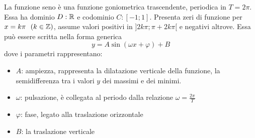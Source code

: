 \documentclass{article}     %
\begin{document}
        \begin{wrapfigure}{r}{0.5\textwidth}
            \centering
            \begin{center}
            \end{center}
        \end{wrapfigure}
        La funzione seno è una funzione goniometrica trascendente, periodica in $T=2\pi$. Essa ha dominio $D:\mathbb{R}$ e codominio $C:[-1;1]$. Presenta zeri di funzione per $x=k\pi~~(k\in\mathbb{Z})$, assume valori positivi in $]2k\pi;\pi+2k\pi[$ e negativi altrove. Essa può essere scritta nella forma generica \[y=A\sin(\omega x +\varphi)+B\] dove i parametri rappresentano:
        \begin{itemize}
            \item $A$: ampiezza, rappresenta la dilatazione verticale della funzione, la semidifferenza tra i valori $y$ dei massimi e dei minimi.
            \item $\omega$: pulsazione, è collegata al periodo dalla relazione $\omega =\frac{2\pi}{T}$
            \item $\varphi$: fase, legato alla traslazione orizzontale
            \item $B$: la traslazione verticale
        \end{itemize}
\end{document}
